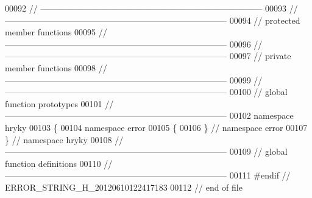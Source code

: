 \begin{DoxyCode}
00092 \textcolor{comment}{//
      ------------------------------------------------------------------------------}
00093 \textcolor{comment}{//
      ------------------------------------------------------------------------------}
00094 \textcolor{comment}{// protected member functions}
00095 \textcolor{comment}{//
      ------------------------------------------------------------------------------}
00096 \textcolor{comment}{//
      ------------------------------------------------------------------------------}
00097 \textcolor{comment}{// private member functions}
00098 \textcolor{comment}{//
      ------------------------------------------------------------------------------}
00099 \textcolor{comment}{//
      ------------------------------------------------------------------------------}
00100 \textcolor{comment}{// global function prototypes}
00101 \textcolor{comment}{//
      ------------------------------------------------------------------------------}
00102 \textcolor{keyword}{namespace }hryky
00103 \{
00104 \textcolor{keyword}{namespace }error
00105 \{
00106 \} \textcolor{comment}{// namespace error}
00107 \} \textcolor{comment}{// namespace hryky}
00108 \textcolor{comment}{//
      ------------------------------------------------------------------------------}
00109 \textcolor{comment}{// global function definitions}
00110 \textcolor{comment}{//
      ------------------------------------------------------------------------------}
00111 \textcolor{preprocessor}{#endif // ERROR\_STRING\_H\_20120610122417183}
00112 \textcolor{preprocessor}{}\textcolor{comment}{// end of file}
\end{DoxyCode}
